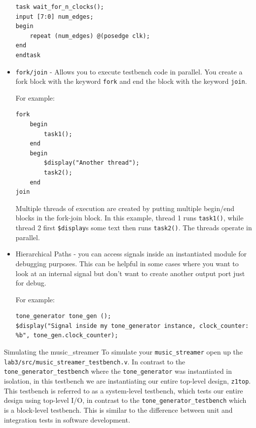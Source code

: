\documentclass[11pt]{article}
\makeatletter
\renewcommand{\section}
{\@startsection {section}{1}{0pt}
 {-2ex}
 {1ex}
 {\bfseries\Large}}
\makeatother
\begin{document}
\begin{itemize}
\begin{verbatim}
task wait_for_n_clocks();
input [7:0] num_edges;
begin
	repeat (num_edges) @(posedge clk);
end
endtask
\end{verbatim}

\item \verb|fork/join| - Allows you to execute testbench code in parallel. You create a fork block with the keyword \verb|fork| and end the block with the keyword \verb|join|.

For example:
\begin{verbatim}
fork
	begin
		task1();
	end
	begin
		$display("Another thread");
		task2();
	end
join
\end{verbatim}

Multiple threads of execution are created by putting multiple begin/end blocks in the fork-join block. In this example, thread 1 runs \verb|task1()|, while thread 2 first \verb|$display|s some text then runs \verb|task2()|. The threads operate in parallel.

\item Hierarchical Paths - you can access signals inside an instantiated module for debugging purposes. This can be helpful in some cases where you want to look at an internal signal but don't want to create another output port just for debug.

For example:
\begin{verbatim}
tone_generator tone_gen ();
$display("Signal inside my tone_generator instance, clock_counter: %b", tone_gen.clock_counter);
\end{verbatim} 
\end{itemize}


\section{Simulating the music\_streamer}
To simulate your \verb|music_streamer| open up the \verb|lab3/src/music_streamer_testbench.v|. In contrast to the \verb|tone_generator_testbench| where the \verb|tone_generator| was instantiated in isolation, in this testbench we are instantiating our entire top-level design, \verb|z1top|. This testbench is referred to as a system-level testbench, which tests our entire design using top-level I/O, in contrast to the \verb|tone_generator_testbench| which is a block-level testbench. This is similar to the difference between unit and integration tests in software development.
\end{document}
